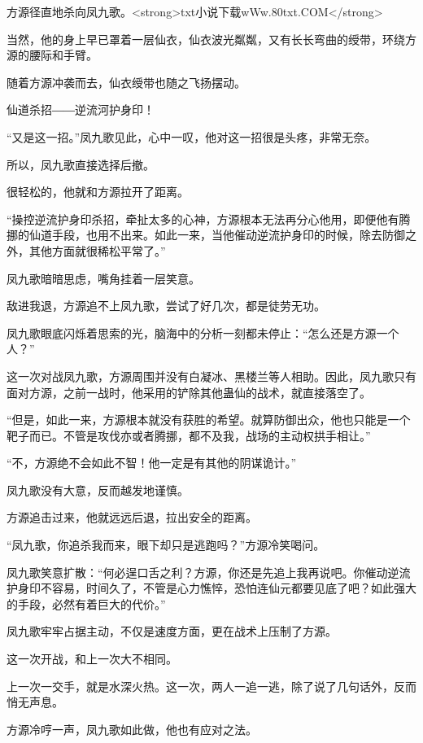 
\begin{this_body}

方源径直地杀向凤九歌。<strong>txt小说下载wWw.80txt.COM</strong>

当然，他的身上早已罩着一层仙衣，仙衣波光粼粼，又有长长弯曲的绶带，环绕方源的腰际和手臂。

随着方源冲袭而去，仙衣绶带也随之飞扬摆动。

仙道杀招――逆流河护身印！

“又是这一招。”凤九歌见此，心中一叹，他对这一招很是头疼，非常无奈。

所以，凤九歌直接选择后撤。

很轻松的，他就和方源拉开了距离。

“操控逆流护身印杀招，牵扯太多的心神，方源根本无法再分心他用，即便他有腾挪的仙道手段，也用不出来。如此一来，当他催动逆流护身印的时候，除去防御之外，其他方面就很稀松平常了。”

凤九歌暗暗思虑，嘴角挂着一层笑意。

敌进我退，方源追不上凤九歌，尝试了好几次，都是徒劳无功。

凤九歌眼底闪烁着思索的光，脑海中的分析一刻都未停止：“怎么还是方源一个人？”

这一次对战凤九歌，方源周围并没有白凝冰、黑楼兰等人相助。因此，凤九歌只有面对方源，之前一战时，他采用的铲除其他蛊仙的战术，就直接落空了。

“但是，如此一来，方源根本就没有获胜的希望。就算防御出众，他也只能是一个靶子而已。不管是攻伐亦或者腾挪，都不及我，战场的主动权拱手相让。”

“不，方源绝不会如此不智！他一定是有其他的阴谋诡计。”

凤九歌没有大意，反而越发地谨慎。

方源追击过来，他就远远后退，拉出安全的距离。

“凤九歌，你追杀我而来，眼下却只是逃跑吗？”方源冷笑喝问。

凤九歌笑意扩散：“何必逞口舌之利？方源，你还是先追上我再说吧。你催动逆流护身印不容易，时间久了，不管是心力憔悴，恐怕连仙元都要见底了吧？如此强大的手段，必然有着巨大的代价。”

凤九歌牢牢占据主动，不仅是速度方面，更在战术上压制了方源。

这一次开战，和上一次大不相同。

上一次一交手，就是水深火热。这一次，两人一追一逃，除了说了几句话外，反而悄无声息。

方源冷哼一声，凤九歌如此做，他也有应对之法。


\end{this_body}
